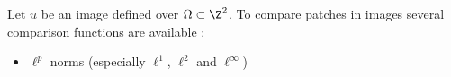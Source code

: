\documentclass[a0paper,portrait]{baposter}
\begin{document}
\begin{poster}
{%
  Let $u$ be an image defined over $\Omega \subset \Z^2$. \newline
  To compare patches in images several comparison functions are available \cite{deledalle2012compare}:
  \vspace{-0.2cm}
  \begin{itemize}[leftmargin=*]
  \item $\ell^p$ norms (especially \textcolor{red_mat}{$\ell^1$}, \textcolor{blue_mat}{$\ell^2$} and \textcolor{green_mat}{$\ell^{\infty}$})

\end{itemize}}
\end{poster}
\end{document}
